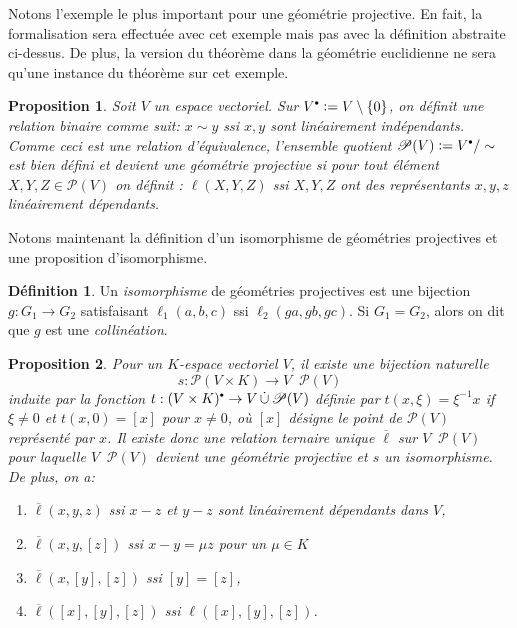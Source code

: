 \documentclass[12pt, oneside]{memoir}
\newtheorem{prop}{Proposition}
\theoremstyle{definition}
\newtheorem{defn}{Définition}
\newcommand{\unbutton}[1][.6]{\mathbin{\vcenter{\hbox{\scalebox{#1}{$\bullet$}}}}}
\newcommand{\defeq}{\vcentcolon=}
\newcommand{\set}[1]{\{ #1 \}}
\newcommand{\proj}{\boldsymbol{\mathscr{P}}}
\newcommand{\discup}{\mathop{\dot{\cup}}}
\begin{document}
Notons l'exemple le plus important pour une géométrie projective. En
fait, la formalisation sera effectuée avec cet exemple mais pas avec
la définition abstraite ci-dessus. De plus, la version du théorème
dans la géométrie euclidienne ne sera qu'une instance du théorème sur
cet exemple.
\begin{prop}
  Soit $V$ un espace vectoriel. Sur
  $V^{\unbutton} \defeq V \setminus \set{0}$, on définit une relation
  binaire comme suit: $x \sim y$ ssi $x, y$ sont linéairement
  indépendants. Comme ceci est une relation d'équivalence, l'ensemble
  quotient $\proj(V) \defeq V^{\unbutton} / \sim$ est bien défini et
  devient une géométrie projective si pour tout élément
  $X, Y, Z \in \proj(V)$ on définit : $\ell(X,Y,Z)$ ssi $X, Y, Z$ ont
  des représentants $x, y, z$ linéairement dépendants.
\end{prop}
Notons maintenant la définition d'un isomorphisme de géométries
projectives et une proposition d'isomorphisme.
\begin{defn}
  Un \textit{isomorphisme} de géométries projectives est une bijection
  $g: G_1 \to G_2$ satisfaisant $\ell_1(a,b,c)$ ssi
  $\ell_2(ga,gb,gc)$. Si $G_1 = G_2$, alors on dit que $g$ est une
  \textit{collinéation}.
\end{defn}
\begin{prop}
  Pour un $K$-espace vectoriel $V$, il existe une bijection naturelle
  \begin{equation*}
    \label{natural-bijection}
    s: \proj(V \times K) \to V \discup \proj(V)
  \end{equation*}
  induite par la fonction
  $t: (V \times K)^{\unbutton} \to V \discup \proj(V)$ définie par
  $t(x,\xi) = \xi^{-1}x$ if $\xi \neq 0$ et $t(x,0) = [x]$ pour
  $x \neq 0$, où $[x]$ désigne le point de $\proj(V)$ représenté par
  $x$. Il existe donc une relation ternaire unique $\overline{\ell}$ sur
  $V \discup \proj(V)$ pour laquelle $V \discup \proj(V)$ devient une
  géométrie projective et $s$ un isomorphisme. De plus, on a:
  \begin{enumerate}[align=left]
  \item $\overline{\ell}(x, y, z)$ \tabto{3cm} ssi $x-z$ et $y-z$ sont linéairement
    dépendants dans $V$,
  \item $\overline{\ell}(x, y, [z])$ \tabto{3cm} ssi $x-y = \mu z$ pour un $\mu \in
    K$
  \item $\overline{\ell}(x, [y], [z])$ \tabto{3cm} ssi $[y] = [z]$,
  \item $\overline{\ell}([x], [y], [z])$ \tabto{3cm} ssi $\ell([x], [y], [z])$.
  \end{enumerate}
\end{prop}
\end{document}
